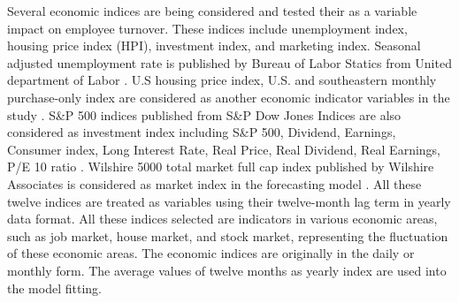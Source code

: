 \documentclass[12pt,letterpaper]{article}
\begin{document}
Several economic indices are being considered and tested their as a variable impact on employee turnover. These indices include unemployment index, housing price index (HPI), investment index, and marketing index. Seasonal adjusted unemployment rate is published by Bureau of Labor Statics from United department of Labor \citep{unemployment}. U.S housing price index, U.S. and southeastern monthly purchase-only index are considered as another economic indicator variables in the study \citep{HPI}. S\&P 500 indices published from S\&P Dow Jones Indices are also considered as investment index including S\&P 500, Dividend, Earnings, Consumer index, Long Interest Rate, Real Price, Real Dividend, Real Earnings, P/E 10 ratio \citep{sp500}. Wilshire 5000 total market full cap index published by Wilshire Associates is considered as market index in the forecasting model \citep{will5000}. All these twelve indices are treated as variables using their twelve-month lag term in yearly data format. All these indices selected are indicators in various economic areas, such as job market, house market, and stock market, representing the fluctuation of these economic areas. The economic indices are originally in the daily or monthly form. The average values of twelve months as yearly index are used into the model fitting.
\end{document}

